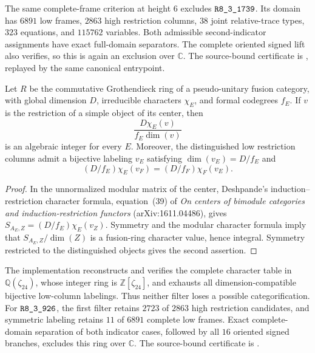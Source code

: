 The same complete-frame criterion at height $6$ excludes
$\sha{R8_3_1739}$. Its domain has $6891$ low frames, $2863$ high
restriction columns, $38$ joint relative-trace types, $323$ equations,
and $115762$ variables. Both admissible second-indicator assignments
have exact full-domain separators. The complete oriented signed lift
also verifies, so this is again an exclusion over $\mathbb C$.
The source-bound certificate is
,
replayed by the same canonical entrypoint.

\begin{proposition}
Let $R$ be the commutative Grothendieck ring of a pseudo-unitary fusion
category, with global dimension $D$, irreducible characters $\chi_E$,
and formal codegrees $f_E$. If $v$ is the restriction of a simple object
of its center, then
\[
 \frac{D\chi_E(v)}{f_E\dim(v)}
\]
is an algebraic integer for every $E$. Moreover, the distinguished low
restriction columns admit a bijective labeling $v_E$ satisfying
$\dim(v_E)=D/f_E$ and
\[
 (D/f_E)\chi_E(v_F)=(D/f_F)\chi_F(v_E).
\]
\end{proposition}
\begin{proof}
In the unnormalized modular matrix of the center, Deshpande's
induction--restriction character formula, equation~(39) of
\emph{On centers of bimodule categories and induction-restriction
functors} (arXiv:1611.04486), gives
$S_{A_E,Z}=(D/f_E)\chi_E(v_Z)$. Symmetry and the modular character
formula imply that $S_{A_E,Z}/\dim(Z)$ is a fusion-ring character
value, hence integral. Symmetry restricted to the distinguished
objects gives the second assertion.
\end{proof}

The implementation reconstructs and verifies the complete character
table in $\mathbb Q(\zeta_{24})$, whose integer ring is
$\mathbb Z[\zeta_{24}]$, and exhausts all dimension-compatible
bijective low-column labelings. Thus neither filter loses a possible
categorification. For $\sha{R8_3_926}$, the first filter retains $2723$ of
$2863$ high restriction candidates, and symmetric labeling retains
$11$ of $6891$ complete low frames. Exact complete-domain separation
of both indicator cases, followed by all $16$ oriented signed
branches, excludes this ring over $\mathbb C$. The source-bound
certificate is .

